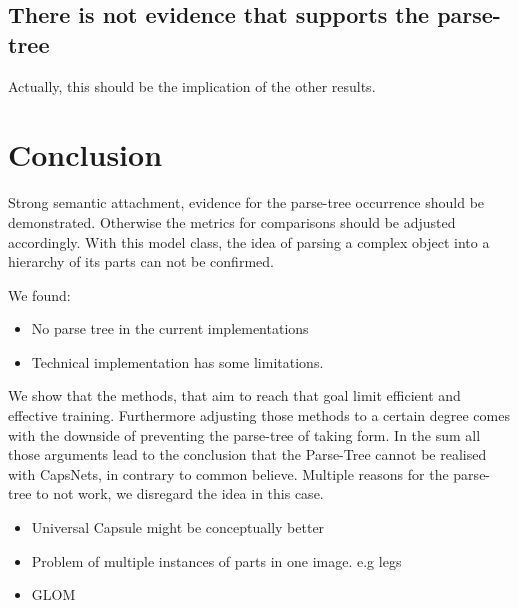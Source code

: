 \documentclass{article}
\begin{document}
\subsection{There is not evidence that supports the parse-tree}
Actually, this should be the implication of the other results.

\section{Conclusion}

Strong semantic attachment, evidence for the parse-tree occurrence should be demonstrated. Otherwise the metrics for comparisons should be adjusted accordingly.
With this model class, the idea of parsing a complex object into a hierarchy of its parts can not be confirmed.

We found:
\begin{itemize}
	\item No parse tree in the current implementations
	\item Technical implementation has some limitations.
\end{itemize}

We show that the methods, that aim to reach that goal limit efficient and effective training.
Furthermore adjusting those methods to a certain degree comes with the downside of preventing the parse-tree of taking form.
In the sum all those arguments lead to the conclusion that the Parse-Tree cannot be realised with CapsNets, in contrary to common believe.
Multiple reasons for the parse-tree to not work, we disregard the idea in this case.

\begin{itemize}
	\item Universal Capsule might be conceptually better
	\item Problem of multiple instances of parts in one image. e.g legs
	\item GLOM
\end{itemize}

%


\end{document}
